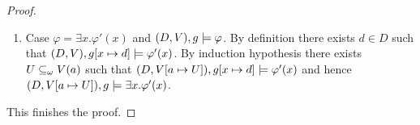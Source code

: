 \begin{proof}
\begin{enumerate}[\textbullet]
\item Case $\varphi = \exists x.\varphi'(x)$ and $(D,V),g \models \varphi$. By definition there exists $d\in D$ such that $(D,V),g[x\mapsto d] \models \varphi'(x)$. By induction hypothesis there exists $U \subseteq_\omega V(a)$ such that $(D,V[a\mapsto U]),g[x\mapsto d] \models \varphi'(x)$ and hence $(D,V[a\mapsto U]),g \models \exists x.\varphi'(x)$.
\end{enumerate}
This finishes the proof.
\end{proof}

